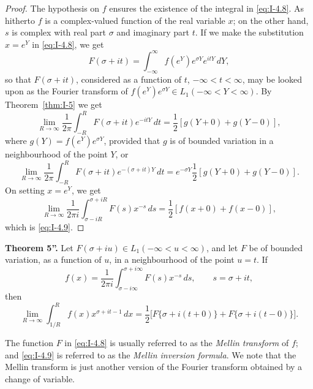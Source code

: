 \begin{proof}
The hypothesis on $f$ ensures the existence of the integral in \eqref{eq:I-4.8}. As hitherto $f$ is a complex-valued function of the real variable $x$; on the other hand, $s$ is complex with real part $\sigma$ and imaginary part $t$. If we make the substitution $x=e^Y$ in \eqref{eq:I-4.8}, we get
\begin{equation*}
F(\sigma+it)=\int_{-\infty}^{\infty}f(e^Y)e^{\sigma Y}e^{itY}\,dY,
\end{equation*}
so that $F(\sigma+it)$, considered as a function of $t$, $-\infty<t<\infty$, may be looked upon as the Fourier transform of $f(e^Y)e^{\sigma Y}\in L_1(-\infty<Y<\infty)$. By Theorem~\ref{thm:I-5} we get
\begin{equation*}
\lim_{R\to\infty}\frac{1}{2\pi}\int_{-R}^{R}F(\sigma+it)e^{-itY}\,dt
=\frac12[g(Y+0)+g(Y-0)],
\end{equation*}
where $g(Y)=f(e^Y)e^{\sigma Y}$, provided that $g$ is of bounded variation in a neighbourhood of the point $Y$, or
\begin{equation*}
\lim_{R\to\infty}\frac{1}{2\pi}\int_{-R}^{R}F(\sigma+it)e^{-(\sigma+it)Y}\,dt
=e^{-\sigma Y}\frac12[g(Y+0)+g(Y-0)].
\end{equation*}
On setting $x=e^Y$, we get
\begin{equation*}
\lim_{R\to\infty}\frac{1}{2\pi i}\int_{\sigma-iR}^{\sigma+iR}F(s)x^{-s}\,ds
=\frac12[f(x+0)+f(x-0)],
\end{equation*}
which is \eqref{eq:I-4.9}.
\end{proof}

\noindent\textbf{Theorem 5''.}
Let $F(\sigma+iu)\in L_1(-\infty<u<\infty)$, and let $F$ be of bounded variation, as a function of $u$, in a neighbourhood of the point $u=t$. If
\begin{equation*}
f(x)=\frac{1}{2\pi i}\int_{\sigma-i\infty}^{\sigma+i\infty}F(s)x^{-s}\,ds,
\qquad s=\sigma+it,
\end{equation*}
then
\begin{equation*}
\lim_{R\to\infty}\int_{1/R}^{R}f(x)x^{\sigma+it-1}\,dx
=\frac12\bigl[F\{\sigma+i(t+0)\}+F\{\sigma+i(t-0)\}\bigr].
\end{equation*}

The function $F$ in \eqref{eq:I-4.8} is usually referred to as the \emph{Mellin transform} of $f$; and \eqref{eq:I-4.9} is referred to as the \emph{Mellin inversion formula}. We note that the Mellin transform is just another version of the Fourier transform obtained by a change of variable.

